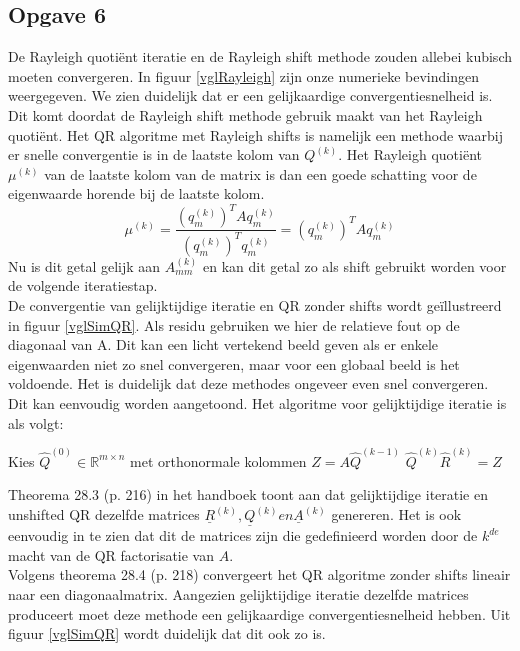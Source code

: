\documentclass[a4paper, 12pt, titlepage]{report}
\begin{document}
\subsection{Opgave 6}
De Rayleigh quoti\"ent iteratie en de Rayleigh shift methode zouden allebei kubisch moeten convergeren. In figuur \ref{vglRayleigh} zijn onze numerieke bevindingen weergegeven. We zien duidelijk dat er een gelijkaardige convergentiesnelheid is. Dit komt doordat de Rayleigh shift methode gebruik maakt van het Rayleigh quoti\"ent. Het QR algoritme met Rayleigh shifts is namelijk een methode waarbij er snelle convergentie is in de laatste kolom van $Q^{(k)}$. Het Rayleigh quoti\"ent $\mu^{(k)}$ van de laatste kolom van de matrix is dan een goede schatting voor de eigenwaarde horende bij de laatste kolom. 
\begin{equation}
	\mu^{(k)} = \frac{(q^{(k)}_m)^TAq^{(k)}_m}{(q^{(k)}_m)^Tq^{(k)}_m} = (q^{(k)}_m)^TAq^{(k)}_m
	\label{eqn:rayleighquotient}
\end{equation}
Nu is dit getal gelijk aan $A^{(k)}_{mm}$ en kan dit getal zo als shift gebruikt worden voor de volgende iteratiestap.\\

De convergentie van gelijktijdige iteratie en QR zonder shifts wordt ge\"illustreerd in figuur \ref{vglSimQR}. Als residu gebruiken we hier de relatieve fout op de diagonaal van A. Dit kan een licht vertekend beeld geven als er enkele eigenwaarden niet zo snel convergeren, maar voor een globaal beeld is het voldoende. Het is duidelijk dat deze methodes ongeveer even snel convergeren. Dit kan eenvoudig worden aangetoond. Het algoritme voor gelijktijdige iteratie is als volgt:

\begin{algorithmic}
 \STATE Kies $\hat{Q}^{(0)}\in \mathbb{R}^{m\times n}$ met orthonormale kolommen
 	\STATE $Z = A\hat{Q}^{(k-1)}$
 	\STATE $\hat{Q}^{(k)}\hat{R}^{(k)} = Z$
 \ENDFOR
\end{algorithmic}

Theorema 28.3 (p. 216) in het handboek toont aan dat gelijktijdige iteratie en unshifted QR dezelfde matrices $\underline{R}^{(k)},\underline{Q}^{(k)} en \underline{A}^{(k)}$ genereren. Het is ook eenvoudig in te zien dat dit de matrices zijn die gedefinieerd worden door de $k^{de}$ macht van de QR factorisatie van $A$.\\

Volgens theorema 28.4 (p. 218) convergeert het QR algoritme zonder shifts lineair naar een diagonaalmatrix. Aangezien gelijktijdige iteratie dezelfde matrices produceert moet deze methode een gelijkaardige convergentiesnelheid hebben. Uit figuur \ref{vglSimQR} wordt duidelijk dat dit ook zo is. 
\end{document}
